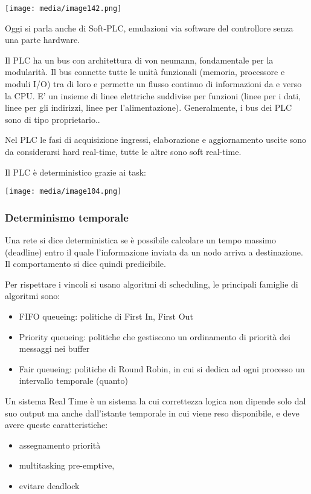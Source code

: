 \texttt{[image: media/image142.png]}

Oggi si parla anche di Soft-PLC, emulazioni via software del controllore
senza una parte hardware.

Il PLC ha un bus con architettura di von neumann, fondamentale per la
modularità. Il bus connette tutte le unità funzionali (memoria,
processore e moduli I/O) tra di loro e permette un flusso continuo di
informazioni da e verso la CPU. E' un insieme di linee elettriche
suddivise per funzioni (linee per i dati, linee per gli indirizzi, linee
per l'alimentazione). Generalmente, i bus dei PLC sono di tipo
proprietario..

Nel PLC le fasi di acquisizione ingressi, elaborazione e aggiornamento
uscite sono da considerarsi hard real-time, tutte le altre sono soft
real-time.

Il PLC è deterministico grazie ai task:

\texttt{[image: media/image104.png]}

\subsubsection{Determinismo temporale}\label{determinismo-temporale}

Una rete si dice deterministica se è possibile calcolare un tempo
massimo (deadline) entro il quale l'informazione inviata da un nodo
arriva a destinazione. Il comportamento si dice quindi predicibile.

Per rispettare i vincoli si usano algoritmi di scheduling, le principali
famiglie di algoritmi sono:

\begin{itemize}
\item
  FIFO queueing: politiche di First In, First Out
\item
  Priority queueing: politiche che gestiscono un ordinamento di priorità
  dei messaggi nei buffer
\item
  Fair queueing: politiche di Round Robin, in cui si dedica ad ogni
  processo un intervallo temporale (quanto)
\end{itemize}

Un sistema Real Time è un sistema la cui correttezza logica non dipende
solo dal suo output ma anche dall'istante temporale in cui viene reso
disponibile, e deve avere queste caratteristiche:

\begin{itemize}
\item
  assegnamento priorità
\item
  multitasking pre-emptive,
\item
  evitare deadlock
\end{itemize}

